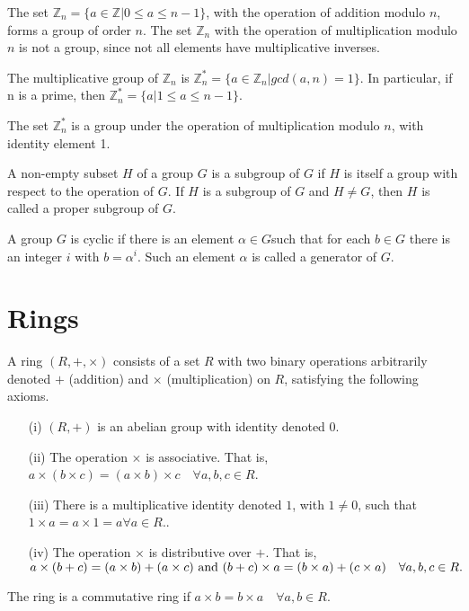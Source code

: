 \begin{myexample} 
	The set $\mathbb{Z}_n=\{a \in \mathbb{Z} | 0 \leq a \leq n - 1\}$, with the operation of addition modulo $n$, forms a group of order $n$. 
	The set $\mathbb{Z}_n$ with the operation of multiplication modulo $n$ is not a group, since not all elements have multiplicative inverses. 
\end{myexample}

\begin{mydef} 
	The multiplicative group of $\mathbb{Z}_n$ is $\mathbb{Z}_n^* = \{a \in \mathbb{Z}_n | gcd(a, n) = 1\}$. 
	In particular, if n is a prime, then $\mathbb{Z}_n^* = \{a | 1 \leq a \leq n - 1\}$.
\end{mydef}

\begin{myexample} 
	The set $\mathbb{Z}_n^*$ is a group under the operation of multiplication modulo $n$, with identity element 1.\end{myexample}

\begin{mydef}
	A non-empty subset $H$ of a group $G$ is a subgroup of $G$ if $H$ is itself a group
	with respect to the operation of $G$. If $H$ is a subgroup of $G$ and $H \neq G$, then $H$ is called a proper subgroup of $G$.
\end{mydef}

\begin{mydef} 
	A group $G$ is cyclic if there is an element $\alpha \in G $such that for each $b \in G$ there is an integer $i$ with $b= \alpha^i$. Such an element $\alpha$ is called a generator of $G$. 
\end{mydef}

\section{Rings}

\begin{mydef} 
	A ring $(R,+,\times)$ consists of a set $R$ with two binary operations arbitrarily denoted $+$ (addition) and $\times$ (multiplication) on $R$, satisfying the following axioms.
	\begin{itemize}
		\item[(i)] $(R, +)$ is an abelian group with identity denoted $0$.
		\item[(ii)] The operation $\times$ is associative. That is, $a \times (b \times c) = (a \times b)\times c \quad \forall a, b, c \in R$.
		\item[(iii)] There is a multiplicative identity denoted $1$, with $1 \neq 0$, such that $1 \times a = a \times 1 = a \forall a \in R.$.
		\item[(iv)] The operation $\times$ is distributive over $+$. That is, $a \times (b+c) = (a \times b)+(a \times c) \textmd{ and } (b + c) \times a = (b \times a) + (c \times a) \quad \forall a, b, c \in R.$
		
	\end{itemize} 
	The ring is a commutative ring if $a \times b = b \times a \quad \forall a, b \in R$.
\end{mydef}

